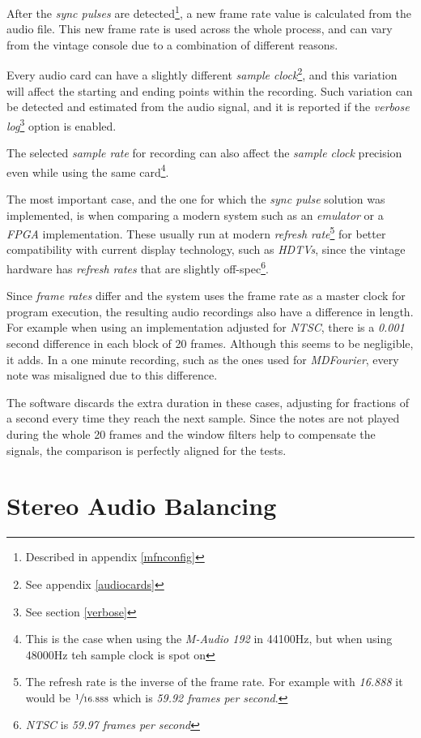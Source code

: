 \documentclass[10pt,a4paper]{report}
\begin{document}
\begin{appendices}
After the \textit{sync pulses} are detected\footnote{Described in appendix \ref{mfnconfig}}, a new frame rate value is calculated from the audio file. This new frame rate is used across the whole process, and can vary from the vintage console due to a combination of different reasons.

Every audio card can have a slightly different \textit{sample clock}\footnote{See appendix \ref{audiocards}}, and this variation will affect the starting and ending points within the recording. Such variation can be detected and estimated from the audio signal, and it is reported if the \textit{verbose log}\footnote{See section \ref{verbose}} option is enabled.

The selected \textit{sample rate} for recording can also affect the \textit{sample clock} precision even while using the same card\footnote{This is the case when using the \textit{M-Audio 192} \cite{maudio} in 44100Hz, but when using 48000Hz teh sample clock is spot on}.

The most important case, and the one for which the \textit{sync pulse} solution was implemented, is when comparing a modern system such as an \textit{emulator} or a \textit{FPGA} implementation. These usually run at modern \textit{refresh rate}\footnote{The refresh rate is the inverse of the frame rate. For example with \textit{16.888} it would be $\sfrac{1}{16.888}$ which is \textit{59.92 frames per second}.} for better compatibility with current display technology, such as \textit{HDTVs}, since the vintage hardware has \textit{refresh rates} that are slightly off-spec\footnote{\textit{NTSC} is \textit{59.97 frames per second}}.

Since \textit{frame rates} differ and the system uses the frame rate as a master clock for program execution, the resulting audio recordings also have a difference in length. For example when using an implementation adjusted for \textit{NTSC}, there is a \textit{0.001} second difference in each block of 20 frames. Although this seems to be negligible, it adds. In a one minute recording, such as the ones used for \textit{MDFourier}, every note was misaligned due to this difference.

The software discards the extra duration in these cases, adjusting for fractions of a second every time they reach the next sample. Since the notes are not played during the whole 20 frames and the window filters help to compensate the signals, the comparison is perfectly aligned for the tests.

\chapter{Stereo Audio Balancing}	


\end{appendices}
\end{document}
